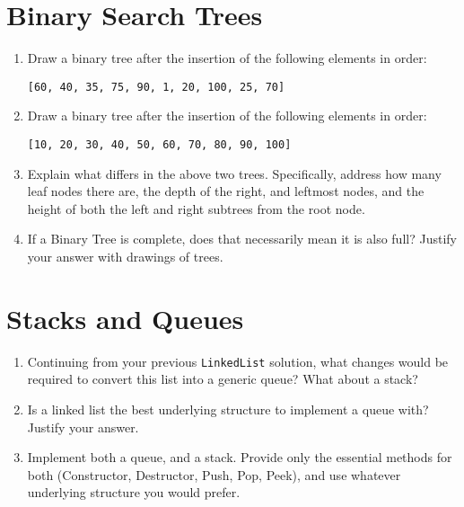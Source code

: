 \documentclass[11pt]{article}
\begin{document}
\section{Binary Search Trees}
\begin{enumerate}
    \item Draw a binary tree after the insertion of the following elements in order: 
    
    \verb|[60, 40, 35, 75, 90, 1, 20, 100, 25, 70]|
    
    \item Draw a binary tree after the insertion of the following elements in order: 
    
    \verb|[10, 20, 30, 40, 50, 60, 70, 80, 90, 100]|
    
    \item Explain what differs in the above two trees. Specifically, address how many leaf nodes there are, the depth of the right, and leftmost nodes, and the height of both the left and right subtrees from the root node.
    
    \item If a Binary Tree is complete, does that necessarily mean it is also full? Justify your answer with drawings of trees.
\end{enumerate}

\section{Stacks and Queues}
\begin{enumerate}
    \item Continuing from your previous \verb|LinkedList| solution, what changes would be required to convert this list into a generic queue? What about a stack?
    \item Is a linked list the best underlying structure to implement a queue with? Justify your answer. 
    \item Implement both a queue, and a stack. Provide only the essential methods for both (Constructor, Destructor, Push, Pop, Peek), and use whatever underlying structure you would prefer.
\end{enumerate}

\label{r:lastpage}
\end{document}
